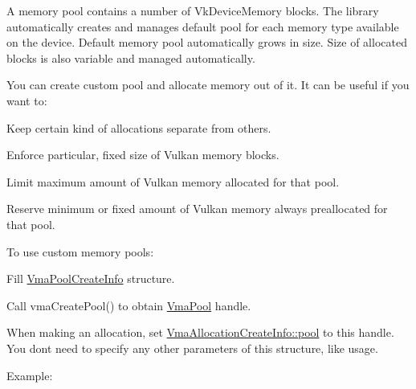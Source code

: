 A memory pool contains a number of {\ttfamily Vk\+Device\+Memory} blocks. The library automatically creates and manages default pool for each memory type available on the device. Default memory pool automatically grows in size. Size of allocated blocks is also variable and managed automatically.

You can create custom pool and allocate memory out of it. It can be useful if you want to\+:


\begin{DoxyItemize}
\item Keep certain kind of allocations separate from others.
\item Enforce particular, fixed size of Vulkan memory blocks.
\item Limit maximum amount of Vulkan memory allocated for that pool.
\item Reserve minimum or fixed amount of Vulkan memory always preallocated for that pool.
\end{DoxyItemize}

To use custom memory pools\+:


\begin{DoxyEnumerate}
\item Fill \hyperlink{structVmaPoolCreateInfo}{Vma\+Pool\+Create\+Info} structure.
\item Call vma\+Create\+Pool() to obtain \hyperlink{structVmaPool}{Vma\+Pool} handle.
\item When making an allocation, set \hyperlink{structVmaAllocationCreateInfo_a6272c0555cfd1fe28bff1afeb6190150}{Vma\+Allocation\+Create\+Info\+::pool} to this handle. You don\textquotesingle{}t need to specify any other parameters of this structure, like {\ttfamily usage}.
\end{DoxyEnumerate}

Example\+:


